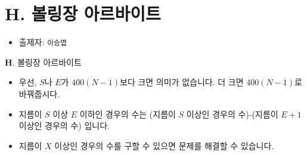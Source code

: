 \section{H. 볼링장 아르바이트}

\begin{frame} %
    \begin{itemize}
        \item 출제자: \texttt{이승엽}
    \end{itemize}
\end{frame}

\begin{frame}{\textbf{H}. 볼링장 아르바이트}
    \begin{itemize}
        \item 우선, $S$나 $E$가 $400(N-1)$보다 크면 의미가 없습니다. 더 크면 $400(N-1)$로 바꿔줍시다.
        \item 지름이 $S$ 이상 $E$ 이하인 경우의 수는 (지름이 $S$ 이상인 경우의 수)-(지름이 $E+1$ 이상인 경우의 수) 입니다.
        \item 지름이 $X$ 이상인 경우의 수를 구할 수 있으면 문제를 해결할 수 있습니다.
    \end{itemize}
\end{frame}